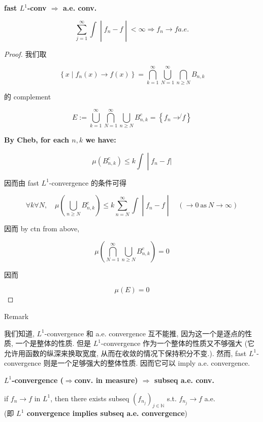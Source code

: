 \documentclass{qlnotes-export}
\begin{document}
\begin{proposition}{\protect{}\label{kn-fast-l-1-conv-implies-a-e-conv}{\textbf{\textbf{fast
\(L^{1}\)-conv \(\Longrightarrow\) a.e. conv.}}}}

\[\left. \sum\limits_{j = 1}^{\infty}\int \middle| f_{n} - f \middle| < \infty\Longrightarrow f_{n}\rightarrow f a.e. \right.\]

\end{proposition}

\begin{proof}

我们取

\[\left\{ {x \mid f_{n}(x)\rightarrow f(x)} \right\} = \bigcap\limits_{k = 1}^{\infty}\bigcup\limits_{N = 1}^{\infty}\bigcap\limits_{n \geq N}B_{n,k}\]

的 complement

\[E := \bigcup\limits_{k = 1}^{\infty}\bigcap\limits_{N = 1}^{\infty}\bigcup\limits_{n \geq N}B_{n,k}^{c} = \left\{ {f_{n}\operatorname{\rightarrow\not{}}f} \right\}\]

\textbf{By Cheb, for each \(n,k\) we have:}

\[\left. \mu(B_{n,k}^{c}) \leq k\int \middle| f_{n} - f| \right.\]

因而由 fast \(L^{1}\)-convergence 的条件可得

\[\left. \forall k\forall N,\quad\mu(\bigcup\limits_{n \geq N}B_{n,k}^{c}) \leq k\sum\limits_{n = N}^{\infty}\int \middle| f_{n} - f \middle| \quad(\rightarrow 0\ \text{as}\ N\rightarrow\infty) \right.\]

因而 by ctn from above,

\[\mu(\bigcap\limits_{N = 1}^{\infty}\bigcup\limits_{n \geq N}B_{n,k}^{c}) = 0\]

因而

\[\mu(E) = 0\]

\end{proof}

\begin{qlremark}{Remark}

我们知道, \(L^{1}\)-convergence 和 a.e. convergence 互不能推, 因为这一个是逐点的性质, 一个是整体的性质. 但是 \(L^{1}\)-convergence 作为一个整体的性质又不够强大 (它允许用函数的纵深来换取宽度, 从而在收敛的情况下保持积分不变.). 然而, fast \(L^{1}\)-convergence 则是一个足够强大的整体性质. 因而它可以 imply a.e. convergence.

\end{qlremark}

\begin{corollary}{\protect{}\label{kn-l-1-convergence-impliesconv-in-measure-implies-subseq-a-e-conv}{\textbf{\(L^{1}\)-convergence
(\(\Longrightarrow\)conv. in measure) \(\Longrightarrow\) subseq a.e.
conv.}}}

if \(f_{n}\rightarrow f\) in \(L^{1}\), then there exists subseq \((f_{n_{j}})_{j \in {\mathbb{N}}}\) s.t. \(f_{n_{j}}\rightarrow f\) a.e.\\
(即 \textbf{\(L^{1}\) convergence implies subseq a.e. convergence})

\end{corollary}
\end{document}

